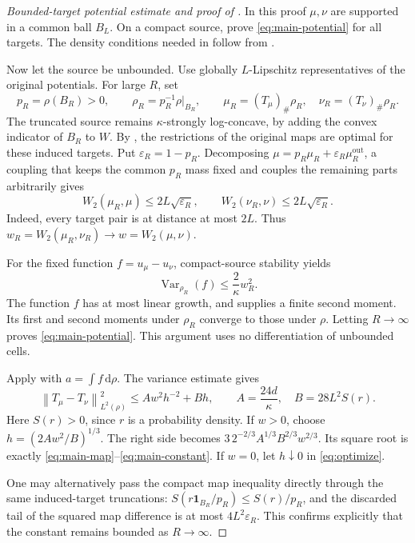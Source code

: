 \documentclass[11pt]{article}
\numberwithin{equation}{section}
\theoremstyle{remark}
\newcommand{\Var}{\operatorname{Var}}
\newcommand{\ind}{\mathbf 1}
\newcommand{\dd}{\,\mathrm d}
\newcommand{\norm}[1]{\left\lVert #1\right\rVert}
\begin{document}
\begin{proof}[Bounded-target potential estimate and proof of ]
In this proof $\mu,\nu$ are supported in a common ball $B_L$. On a compact source,  prove \eqref{eq:main-potential} for all targets. The density conditions needed in  follow from .

Now let the source be unbounded. Use globally $L$-Lipschitz representatives of the original potentials. For large $R$, set
\[
 p_R=\rho(B_R)>0,\qquad \rho_R=p_R^{-1}\rho|_{B_R},\qquad
 \mu_R=(T_\mu)_\#\rho_R,\quad \nu_R=(T_\nu)_\#\rho_R.
\]
The truncated source remains $\kappa$-strongly log-concave, by adding the convex indicator of $B_R$ to $W$. By , the restrictions of the original maps are optimal for these induced targets. Put $\varepsilon_R=1-p_R$. Decomposing
$\mu=p_R\mu_R+\varepsilon_R\mu_R^{\mathrm{out}}$, a coupling that keeps the common $p_R$ mass fixed and couples the remaining parts arbitrarily gives
\begin{equation}\label{eq:induced-target-bound}
 W_2(\mu_R,\mu)\le2L\sqrt{\varepsilon_R},\qquad
 W_2(\nu_R,\nu)\le2L\sqrt{\varepsilon_R}.
\end{equation}
Indeed, every target pair is at distance at most $2L$. Thus $w_R=W_2(\mu_R,\nu_R)\to w=W_2(\mu,\nu)$.

For the fixed function $f=u_\mu-u_\nu$, compact-source stability yields
\[
 \Var_{\rho_R}(f)\le\frac2\kappa w_R^2.
\]
The function $f$ has at most linear growth, and  supplies a finite second moment. Its first and second moments under $\rho_R$ converge to those under $\rho$. Letting $R\to\infty$ proves \eqref{eq:main-potential}. This argument uses no differentiation of unbounded cells.

Apply  with $a=\int f\dd\rho$. The variance estimate gives
\begin{equation}\label{eq:optimize}
 \norm{T_\mu-T_\nu}_{L^2(\rho)}^2
 \le A w^2h^{-2}+Bh,
 \qquad A=\frac{24d}\kappa,\quad B=28L^2S(r).
\end{equation}
Here $S(r)>0$, since $r$ is a probability density. If $w>0$, choose
$h=(2Aw^2/B)^{1/3}$. The right side becomes
$3\,2^{-2/3}A^{1/3}B^{2/3}w^{2/3}$. Its square root is exactly \eqref{eq:main-map}--\eqref{eq:main-constant}. If $w=0$, let $h\downarrow0$ in \eqref{eq:optimize}.

One may alternatively pass the compact map inequality directly through the same induced-target truncations: $S(r\ind_{B_R}/p_R)\le S(r)/p_R$, and the discarded tail of the squared map difference is at most $4L^2\varepsilon_R$. This confirms explicitly that the constant remains bounded as $R\to\infty$.
\end{proof}
\end{document}
